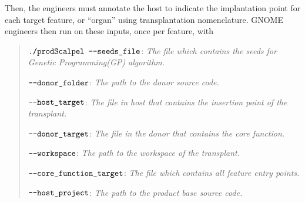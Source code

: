 Then, the engineers must annotate the host to indicate the implantation point for each target feature, or “organ” using transplantation nomenclature. GNOME engineers then run \prodscalpel on these inputs, once per feature, with 
\begin{quote}
    $\texttt{./prodScalpel \textemdash \textemdash seeds\_file}$: \textit{ The file which contains the seeds for Genetic Programming(GP) algorithm.} 

    $\texttt{\textemdash \textemdash donor\_folder}$: \textit{The path to the donor source code.} 
    
    $\texttt{\textemdash \textemdash host\_target}$: \textit{The file in host that contains the insertion point of the transplant.}
    
    $\texttt{\textemdash \textemdash donor\_target}$: \textit{The file in the donor that contains the core function.}
    
    $\texttt{\textemdash \textemdash workspace}$: \textit{The path to the workspace of the transplant.}
    
    $\texttt{\textemdash \textemdash core\_function\_target}$: \textit{The file which contains all feature entry points.}
    
     $\texttt{\textemdash \textemdash  host\_project}$: \textit{The path to the product base source code.}
     
   \end{quote} 
%
